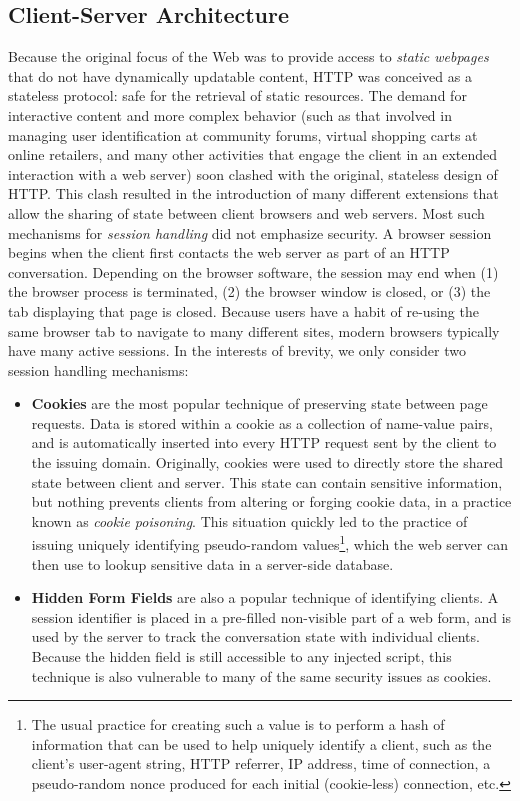 \documentclass{acmtrans2m}
\begin{document}
\subsection{Client-Server Architecture}\label{sec:client-server-architecture}

Because the original focus of the Web was to provide access to \emph{static webpages} that do not have dynamically updatable content, HTTP was conceived as a stateless protocol: safe for the retrieval of static resources.
The demand for interactive content and more complex behavior (such as that involved in managing user identification at community forums, virtual shopping carts at online retailers, and many other activities that engage the client in an extended interaction with a web server) soon clashed with the original, stateless design of HTTP.
This clash resulted in the introduction of many different extensions that allow the sharing of state between client browsers and web servers.
Most such mechanisms for \emph{session handling} did not emphasize security.
A browser session begins when the client first contacts the web server as part of an HTTP conversation.
Depending on the browser software, the session may end when (1) the browser process is terminated, (2) the browser window is closed, or (3) the tab displaying that page is closed.
Because users have a habit of re-using the same browser tab to navigate to many different sites, modern browsers typically have many active sessions.
In the interests of brevity, we only consider two session handling mechanisms:

\begin{itemize}
 \item \textbf{Cookies} are the most popular technique of preserving state between page requests.
Data is stored within a cookie as a collection of name-value pairs, and is automatically inserted into every HTTP request sent by the client to the issuing domain.
Originally, cookies were used to directly store the shared state between client and server.
This state can contain sensitive information, but nothing prevents clients from altering or forging cookie data, in a practice known as \emph{cookie poisoning}.
This situation quickly led to the practice of issuing uniquely identifying pseudo-random values\footnote{The usual practice for creating such a value is to perform a hash of information that can be used to help uniquely identify a client, such as the client's user-agent string, HTTP referrer, IP address, time of connection, a pseudo-random nonce produced for each initial (cookie-less) connection, etc.}, which the web server can then use to lookup sensitive data in a server-side database.

 \item \textbf{Hidden Form Fields} are also a popular technique of identifying clients.
A session identifier is placed in a pre-filled non-visible part of a web form, and is used by the server to track the conversation state with individual clients.
Because the hidden field is still accessible to any injected script, this technique is also vulnerable to many of the same security issues as cookies.
\end{itemize}
\end{document}
